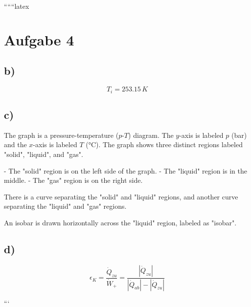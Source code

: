 
``````latex


\section*{Aufgabe 4}

\subsection*{b)}

\[
T_i = 253.15\,K
\]

\subsection*{c)}

The graph is a pressure-temperature ($p$-$T$) diagram. The $y$-axis is labeled $p$ (bar) and the $x$-axis is labeled $T$ (°C). The graph shows three distinct regions labeled "solid", "liquid", and "gas". 

- The "solid" region is on the left side of the graph.
- The "liquid" region is in the middle.
- The "gas" region is on the right side.

There is a curve separating the "solid" and "liquid" regions, and another curve separating the "liquid" and "gas" regions. 

An isobar is drawn horizontally across the "liquid" region, labeled as "isobar". 

\subsection*{d)}

\[
\epsilon_K = \frac{\dot{Q}_{zu}}{\dot{W}_{+}} = \frac{|\dot{Q}_{zu}|}{|\dot{Q}_{ab}| - |\dot{Q}_{zu}|}
\]

```